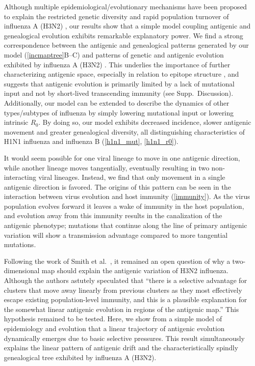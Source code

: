 Although multiple epidemiological/evolutionary mechanisms have been proposed to explain the restricted genetic diversity and rapid population turnover of influenza A (H3N2) \cite{Ferguson03,Tria05,Koelle06,Recker07}, our results show that a simple model coupling antigenic and genealogical evolution exhibits remarkable explanatory power.  We find a strong correspondence between the antigenic and genealogical patterns generated by our model (\ref{incmaptree}B--C) and patterns of genetic and antigenic evolution exhibited by influenza A (H3N2) \cite{Fitch97,Smith04}.  This underlies the importance of further characterizing antigenic space, especially in relation to epitope structure \cite{Recker07}, and suggests that antigenic evolution is primarily limited by a lack of mutational input and not by short-lived transcending immunity (see Supp.~Discussion).  Additionally, our model can be extended to describe the dynamics of other types/subtypes of influenza by simply lowering mutational input or lowering intrinsic $R_0$.  By doing so, our model exhibits decreased incidence, slower antigenic movement and greater genealogical diversity, all distinguishing characteristics of H1N1 influenza and influenza B (\ref{h1n1_mut}, \ref{h1n1_r0}).

It would seem possible for one viral lineage to move in one antigenic direction, while another lineage moves tangentially, eventually resulting in two non-interacting viral lineages.  Instead, we find that only movement in a single antigenic direction is favored.  The origins of this pattern can be seen in the interaction between virus evolution and host immunity (\ref{immunity}).  As the virus population evolves forward it leaves a wake of immunity in the host population, and evolution away from this immunity results in the canalization of the antigenic phenotype; mutations that continue along the line of primary antigenic variation will show a transmission advantage compared to more tangential mutations.  

Following the work of Smith et al.\ \cite{Smith04}, it remained an open question of why a two-dimensional map should explain the antigenic variation of H3N2 influenza.  Although the authors astutely speculated that ``there is a selective advantage for clusters that move away linearly from previous clusters as they most effectively escape existing population-level immunity, and this is a plausible explanation for the somewhat linear antigenic evolution in regions of the antigenic map.''  This hypothesis remained to be tested.  Here, we show from a simple model of epidemiology and evolution that a linear trajectory of antigenic evolution dynamically emerges due to basic selective pressures.  This result simultaneously explains the linear pattern of antigenic drift \cite{Smith04} and the characteristically spindly genealogical tree \cite{Fitch97} exhibited by influenza A (H3N2).

